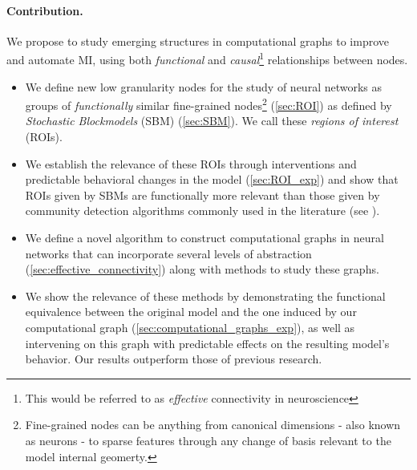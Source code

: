 \documentclass{article}
\begin{document}
\paragraph{Contribution.} We propose to study emerging structures in computational graphs to improve and automate MI, using both \textit{functional} and \textit{causal}\footnote{This would be referred to as \textit{effective} connectivity in neuroscience} relationships between nodes.
\begin{itemize}
    \item We define new low granularity nodes for the study of neural networks as groups of \textit{functionally} similar fine-grained nodes\footnote{Fine-grained nodes can be anything from canonical dimensions - also known as neurons - to sparse features through any change of basis relevant to the model internal geomerty.} (\cref{sec:ROI}) as defined by \textit{Stochastic Blockmodels} (SBM) (\cref{sec:SBM}). We call these \emph{regions of interest} (ROIs).
    \item We establish the relevance of these ROIs through interventions and predictable behavioral changes in the model (\cref{sec:ROI_exp}) and show that ROIs given by SBMs are functionally more relevant than those given by community detection algorithms commonly used in the literature (see \citet{lu2019checking, filan2021clusterability, bushnaq2024using}). %
    \item We define a novel algorithm to construct computational graphs in neural networks that can incorporate several levels of abstraction (\cref{sec:effective_connectivity}) along with methods to study these graphs.
    \item We show the relevance of these methods by demonstrating the functional equivalence between the original model and the one induced by our computational graph (\cref{sec:computational_graphs_exp}), as well as intervening on this graph with predictable effects on the resulting model's behavior. Our results outperform those of previous research.
\end{itemize}
\end{document}
